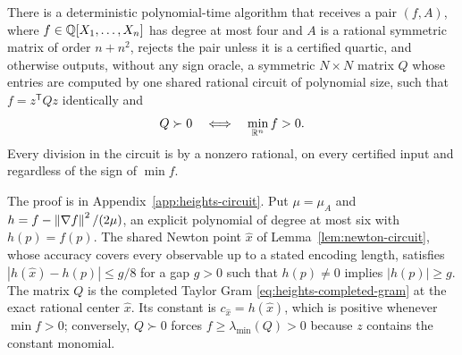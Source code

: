 \begin{theorem}
\label{thm:circuit-gram}
There is a deterministic polynomial-time algorithm that receives a pair
$(f,A)$, where $f\in\mathbb Q[X_1,\ldots,X_n]$ has degree at most four and $A$ is a
rational symmetric matrix of order $n+n^2$, rejects the pair unless it is a
certified quartic, and otherwise outputs, without any sign oracle, a
symmetric $N\times N$ matrix $Q$ whose entries are computed by one shared
rational circuit of polynomial size, such that $f=z^{\mathsf T}Qz$
identically and
\[
 Q\succ0\quad\Longleftrightarrow\quad\min_{\mathbb R^n}f>0 .
\]
Every division in the circuit is by a nonzero rational, on every certified
input and regardless of the sign of $\min f$.
\end{theorem}

The proof is in Appendix~\ref{app:heights-circuit}. Put $\mu=\mu_A$ and
$h=f-\left\lVert\nabla f\right\rVert^2/(2\mu)$, an explicit polynomial of degree at most six
with $h(p)=f(p)$. The shared Newton point $\hat x$ of
Lemma~\ref{lem:newton-circuit}, whose accuracy covers every observable up to
a stated encoding length, satisfies $|h(\hat x)-h(p)|\le g/8$ for a gap $g>0$
such that $h(p)\ne0$ implies $|h(p)|\ge g$. The matrix $Q$ is the completed
Taylor Gram \eqref{eq:heights-completed-gram} at the exact rational center
$\hat x$. Its constant is $c_{\hat x}=h(\hat x)$, which is positive whenever
$\min f>0$; conversely, $Q\succ0$ forces $f\ge\lambda_{\min}(Q)>0$ because
$z$ contains the constant monomial.

